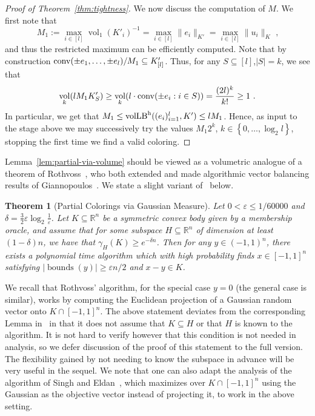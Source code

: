 \documentclass[11pt]{article}
\newtheorem{theorem}{Theorem}
\newcommand{\R}{{\mathbb{R}}}
\newcommand\eps{\varepsilon}
\newcommand{\set}[1]{\left\{ #1 \right\}}
\DeclareMathOperator{\vollb}{volLB}
\DeclareMathOperator{\vol}{vol}
\DeclareMathOperator{\bnds}{bounds}
\newcommand{\notename}[2]{{\textcolor{red}{{\bf (#1:} {#2}{\bf ) }}}}
\newcommand{\notename}[2]{{\textcolor{red}{\footnotesize{\bf (#1:} {#2}{\bf ) }}}}
\newcommand{\dnote}[1]{{\notename{Daniel}{#1}}}
\newcommand{\notename}[2]{{}}
\newcommand{\dnote}[1]{}
\begin{document}
\begin{proof}[Proof of Theorem~\ref{thm:tightness}]
We now discuss the computation of $M$. We first note that 
\[
M_1 := \max_{i \in [l]} \vol_1(K'_i)^{-1} = \max_{i \in [l]} \|e_i\|_{K'} =
\max_{i \in [l]} \|u_i\|_K \text{ ,}
\]
and thus the restricted maximum can be efficiently computed. Note that by
construction ${\rm conv}(\pm e_1,\dots, \pm e_l)/M_1 \subseteq K'_{[l]}$. Thus,
for any $S \subseteq [l]$,$|S|=k$, we see that
\[
\vol_k(l M_1 K'_S) \geq \vol_{k}(l \cdot {\rm conv}(\pm e_i: i \in S)) = \frac{(2l)^k}{k!}
 \geq 1 \text{ .}
\]
In particular, we get that $M_1 \leq \vollb^{\rm h}((e_i)_{i=1}^l,K') \leq l M_1$.
Hence, as input to the stage above we may successively try the values $M_1
2^k$, $k \in \set{0,\dots,\log_2 l}$, stopping the first time we find a valid
coloring. 
\end{proof}

Lemma~\ref{lem:partial-via-volume} should be viewed as a volumetric analogue of
a theorem of Rothvoss~\cite{rothvoss-giann}, who both extended and made
algorithmic vector balancing results of Giannopoulos~\cite{giannop}. We state a
slight variant of~\cite[Lemma 9]{rothvoss-giann} below.


\begin{theorem}[Partial Colorings via Gaussian Measure]\label{thm:roth-giann}
Let $0 < \eps \leq 1/60000$ and $\delta = \frac{3}{2}\eps \log_2
\frac{1}{\eps}$. Let $K \subseteq \R^n$ be a symmetric convex body given by a
membership oracle, and assume that for some subspace $H \subseteq \R^n$ of
dimension at least $(1-\delta)n$, we have that $\gamma_H(K) \geq e^{-\delta n}$.
Then for any $y \in (-1,1)^n$, there exists a polynomial time algorithm which
with high probability finds $x \in [-1,1]^n$ satisfying $|\bnds(y)| \geq \eps
n/2$ and $x-y \in K$.
\end{theorem}

We recall that Rothvoss' algorithm, for the special case $y = 0$ (the general
case is similar), works by computing the Euclidean projection of a Gaussian
random vector onto $K \cap [-1,1]^n$. The above statement deviates from the
corresponding Lemma in~\cite{rothvoss-giann} in that it does not assume that $K
\subseteq H$ or that $H$ is known to the algorithm. It is not hard to verify
however that this condition is not needed in analysis, so we defer discussion of
the proof of this statement to the full version. The flexibility gained by not
needing to know the subspace in advance will be very useful in the sequel. We
note that one can also adapt the analysis of the algorithm of Singh and
Eldan~\cite{ES14}, which maximizes over $K \cap [-1,1]^n$ using the Gaussian as
the objective vector instead of projecting it, to work in the above setting.   
\end{document}
